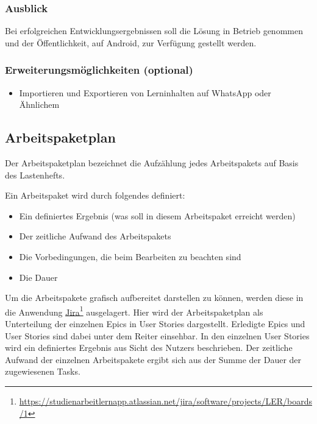\subsubsection{Ausblick}
Bei erfolgreichen Entwicklungsergebnissen soll die Lösung in Betrieb genommen und der Öffentlichkeit, auf Android, zur Verfügung gestellt werden.

\subsubsection{Erweiterungsmöglichkeiten (optional)}
\begin{itemize}
    \item Importieren und Exportieren von Lerninhalten auf WhatsApp oder Ähnlichem
\end{itemize}


\subsection{Arbeitspaketplan}
\label{sec:arbeitspaketplan}
Der Arbeitspaketplan bezeichnet die Aufzählung jedes Arbeitspakets auf Basis des Lastenhefts. \newline 

\noindent 
Ein Arbeitspaket wird durch folgendes definiert: 
\begin{itemize}
    \item Ein definiertes Ergebnis (was soll in diesem Arbeitspaket erreicht werden)
    \item Der zeitliche Aufwand des Arbeitspakets
    \item Die Vorbedingungen, die beim Bearbeiten zu beachten sind
    \item Die Dauer
\end{itemize}


\noindent
Um die Arbeitspakete grafisch aufbereitet darstellen zu können, werden diese in die Anwendung \href{https://studienarbeitlernapp.atlassian.net/jira/software/projects/LER/boards/1}{\underline{Jira}}\footnote{\href{https://studienarbeitlernapp.atlassian.net/jira/software/projects/LER/boards/1}{https://studienarbeitlernapp.atlassian.net/jira/software/projects/LER/boards/1}} ausgelagert.
Hier wird der Arbeitspaketplan als Unterteilung der einzelnen Epics in User Stories dargestellt.
Erledigte Epics und User Stories sind dabei unter dem Reiter  einsehbar.
In den einzelnen User Stories wird ein definiertes Ergebnis aus Sicht des Nutzers beschrieben.
Der zeitliche Aufwand der einzelnen Arbeitspakete ergibt sich aus der Summe der Dauer der zugewiesenen Tasks. 

